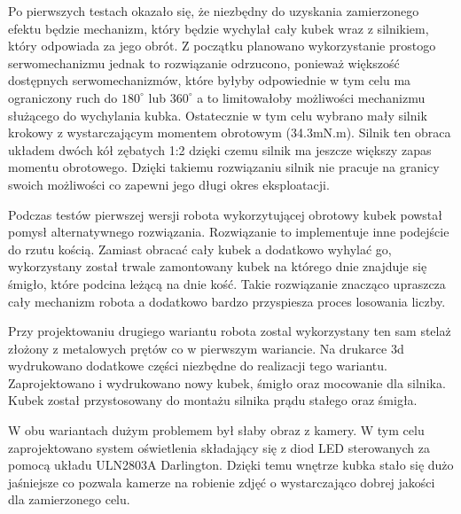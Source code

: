 Po pierwszych testach okazało się, że niezbędny do uzyskania zamierzonego efektu będzie mechanizm, który będzie 
wychylał cały kubek wraz z silnikiem, który odpowiada za jego obrót. Z początku planowano wykorzystanie prostogo
serwomechanizmu jednak to rozwiązanie odrzucono, ponieważ większość dostępnych serwomechanizmów, które byłyby odpowiednie w tym celu ma
ograniczony ruch do $180^{\circ}$ lub $360^{\circ}$ a to limitowałoby możliwości mechanizmu służącego do wychylania kubka.
Ostatecznie w tym celu wybrano mały silnik krokowy z wystarczającym momentem obrotowym (34.3mN.m). Silnik ten obraca 
układem dwóch kół zębatych 1:2 dzięki czemu silnik ma jeszcze większy zapas momentu obrotowego. Dzięki takiemu rozwiązaniu silnik
nie pracuje na granicy swoich możliwości co zapewni jego długi okres eksploatacji. 

Podczas testów pierwszej wersji robota wykorzytującej obrotowy kubek powstał pomysł alternatywnego rozwiązania.
Rozwiązanie to implementuje inne podejście do rzutu kością. Zamiast obracać cały kubek a dodatkowo wyhylać go,
wykorzystany został trwale zamontowany kubek na którego dnie znajduje się śmigło, które podcina leżącą na dnie kość.
Takie rozwiązanie znacząco upraszcza cały mechanizm robota a dodatkowo bardzo przyspiesza proces losowania liczby.

Przy projektowaniu drugiego wariantu robota zostal wykorzystany ten sam stelaż złożony z metalowych prętów co w 
pierwszym wariancie. Na drukarce 3d wydrukowano dodatkowe części niezbędne do realizacji tego wariantu.
Zaprojektowano i wydrukowano nowy kubek, śmigło oraz mocowanie dla silnika. Kubek został przystosowany do montażu 
silnika prądu stałego oraz śmigła. 

W obu wariantach dużym problemem był słaby obraz z kamery. W tym celu zaprojektowano system oświetlenia składający się z diod
LED sterowanych za pomocą układu ULN2803A Darlington. Dzięki temu wnętrze kubka stało się dużo jaśniejsze co pozwala kamerze na
robienie zdjęć o wystarczająco dobrej jakości dla zamierzonego celu. 





